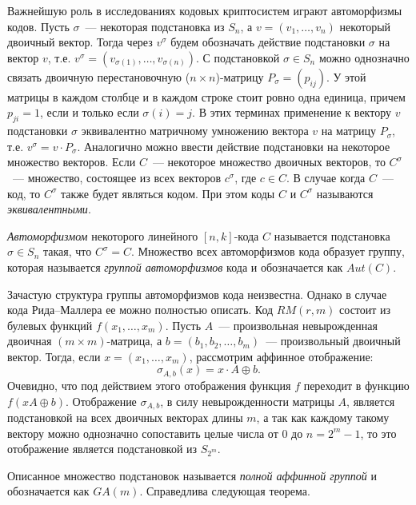 Важнейшую роль в исследованиях кодовых криптосистем играют автоморфизмы кодов.
Пусть \(\sigma\)~--- некоторая подстановка из \(S_n\), а \(v=(v_{1},\ldots,v_n)\) некоторый двоичный вектор.
Тогда через \(v^{\sigma}\) будем обозначать действие подстановки \(\sigma\) на вектор \(v\), т.е.
\(v^{\sigma}=(v_{\sigma(1)},\ldots,v_{\sigma(n)}).\) С подстановкой \(\sigma\in S_n\) можно однозначно связать двоичную перестановочную (\(n\times n\))-матрицу \(P_{\sigma}=(p_{ij})\).
У этой матрицы в каждом столбце и в каждом строке стоит ровно одна единица, причем \(p_{ji}=1\), если и только если \(\sigma(i)=j\).
В этих терминах применение к вектору \(v\) подстановки \(\sigma\) эквивалентно матричному умножению вектора \(v\) на матрицу \(P_\sigma\), т.е.
\(v^\sigma=v\cdot P_\sigma\).
Аналогично можно ввести действие подстановки на некоторое множество векторов.
Если \(C\)~--- некоторое множество двоичных векторов, то \(C^\sigma\)~--- множество, состоящее из всех векторов \(c^\sigma\), где \(c\in C\).
В случае когда \(C\)~--- код, то \(C^\sigma\) также будет являться кодом.
При этом коды \(C\) и \(C^\sigma\) называются \emph{эквивалентными}.

\begin{definition}
	\emph{Автоморфизмом} некоторого линейного \([n,k]\)-кода \(C\) называется подстановка \(\sigma\in S_n\) такая, что \(C^\sigma=C\).
	Множество всех автоморфизмов кода образует группу, которая называется \emph{группой автоморфизмов} кода и обозначается как \( Aut(C).\)
\end{definition}

Зачастую структура группы автоморфизмов кода неизвестна.
Однако в случае кода Рида--Маллера ее можно полностью описать.
Код \(RM(r,m)\) состоит из булевых функций $f(x_1,\ldots, x_m)$.
Пусть \(A\)~--- произвольная невырожденная двоичная \((m\times m)\)-матрица, а \(b=(b_{1},b_{2},\ldots,b_m)\)~---  произвольный двоичный вектор.
Тогда, если $x=(x_1,\ldots, x_m)$, рассмотрим аффинное отображение:
\begin{displaymath}
	\sigma_{A,b}(x)=x\cdot A \oplus b.
\end{displaymath}
Очевидно, что под действием этого отображения функция $f$ переходит в функцию $f(xA\oplus b)$.
Отображение \(\sigma_{A,b} \), в силу невырожденности матрицы $A$, является подстановкой на всех двоичных векторах длины $m$, а так как каждому такому вектору можно однозначно сопоставить целые числа от 0 до $n=2^m-1$, то это отображение является подстановкой из $S_{2^m}$.

Описанное множество подстановок называется \emph{полной аффинной группой} и обозначается как \(GA(m).\) Справедлива следующая теорема.

